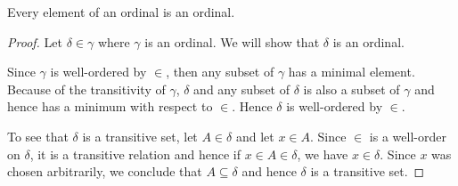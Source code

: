 \begin{proposition}\label{thm:element_of_ordinal_is_ordinal}
   Every element of an ordinal is an ordinal.
\end{proposition}
\begin{proof}
  Let \( \delta \in \gamma \) where \( \gamma \) is an ordinal. We will show that \( \delta \) is an ordinal.

  Since \( \gamma \) is well-ordered by \( \in \), then any subset of \( \gamma \) has a minimal element. Because of the transitivity of \( \gamma \), \( \delta \) and any subset of \( \delta \) is also a subset of \( \gamma \) and hence has a minimum with respect to \( \in \). Hence \( \delta \) is well-ordered by \( \in \).

  To see that \( \delta \) is a transitive set, let \( A \in \delta \) and let \( x \in A \). Since \( \in \) is a well-order on \( \delta \), it is a transitive relation and hence if \( x \in A \in \delta \), we have \( x \in \delta \). Since \( x \) was chosen arbitrarily, we conclude that \( A \subseteq \delta \) and hence \( \delta \) is a transitive set.
\end{proof}

